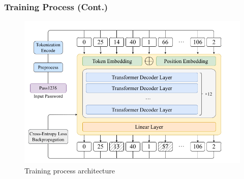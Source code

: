 \documentclass[
	12pt, %
]{beamer}
\begin{document}
\begin{frame}
	\frametitle{Training Process (Cont.)}
	
	\begin{figure}
		\centering
		\includegraphics[width=0.8\linewidth]{Images/img2}
		\caption{Training process architecture}
		\label{fig:Training process architecture}
	\end{figure}
\end{frame}













%
\end{document}
